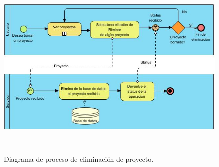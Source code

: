 \begin{figure}[h!]
	\centering
	\includegraphics[width=15cm,height=9cm]{imagenes/desarrollo/diagramas/BPMN_DELETE_PROJECT.jpg}
	\caption{Diagrama de proceso de eliminación de proyecto.}
	\label{fig:deleteproject}
\end{figure}
\clearpage